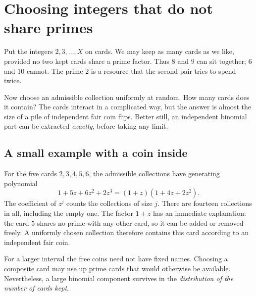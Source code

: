 \section{Choosing integers that do not share primes}\label{fin:selection}
Put the integers $2,3,\ldots,X$ on cards.  We may keep as many cards
as we like, provided no two kept cards share a prime factor.
Thus $8$ and $9$ can sit together; $6$ and $10$ cannot.
The prime $2$ is a resource that the second pair tries to spend twice.

Now choose an admissible collection uniformly at random.
How many cards does it contain?  The cards interact in a complicated
way, but the answer is almost the size of a pile of independent fair
coin flips.  Better still, an independent binomial part can be extracted
\emph{exactly}, before taking any limit.

\subsection{A small example with a coin inside}
For the five cards $2,3,4,5,6$, the admissible collections have
generating polynomial
\[
 1+5z+6z^2+2z^3=(1+z)(1+4z+2z^2).
\]
The coefficient of $z^j$ counts the collections of size $j$.
There are fourteen collections in all, including the empty one.
The factor $1+z$ has an immediate explanation: the card $5$ shares
no prime with any other card, so it can be added or removed freely.
A uniformly chosen collection therefore contains this card according
to an independent fair coin.

For a larger interval the free coins need not have fixed names.
Choosing a composite card may use up prime cards that would otherwise
be available.  Nevertheless, a large binomial component survives in
the \emph{distribution of the number of cards kept}.

